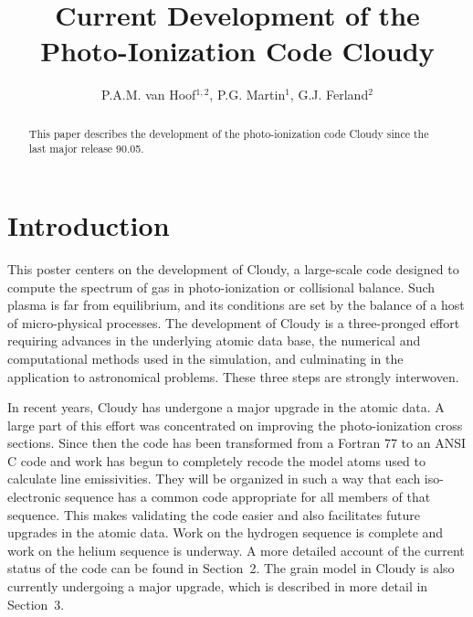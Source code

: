 \def\plotone#1{\centering \leavevmode\epsfxsize=\columnwidth \epsfbox{#1}}

\pagestyle{myheadings}



\title{Current Development of the Photo-Ionization Code Cloudy}
\author{P.A.M. van Hoof$^{1,2}$, P.G. Martin$^1$, G.J. Ferland$^2$}

\begin{abstract}
This paper describes the development of the photo-ionization code Cloudy
since the last major release 90.05.
\end{abstract}

\section{Introduction}

This poster centers on the development of Cloudy, a large-scale code designed
to compute the spectrum of gas in photo-ionization or collisional balance.
Such plasma is far from equilibrium, and its conditions are set by the balance
of a host of micro-physical processes. The development of Cloudy is a
three-pronged effort requiring advances in the underlying atomic data base,
the numerical and computational methods used in the simulation, and
culminating in the application to astronomical problems. These three steps are
strongly interwoven.

In recent years, Cloudy has undergone a major upgrade in the atomic data. A
large part of this effort was concentrated on improving the photo-ionization
cross sections. Since then the code has been transformed from a Fortran 77 to
an ANSI C code and work has begun to completely recode the model atoms used to
calculate line emissivities. They will be organized in such a way that each
iso-electronic sequence has a common code appropriate for all members of that
sequence. This makes validating the code easier and also facilitates future
upgrades in the atomic data. Work on the hydrogen sequence is complete and
work on the helium sequence is underway. A more detailed account of the
current status of the code can be found in Section~2. The grain model in
Cloudy is also currently undergoing a major upgrade, which is described in
more detail in Section~3. 

